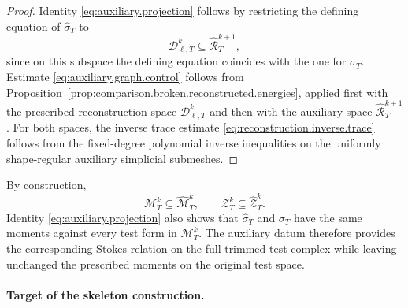 \documentclass[a4paper,11pt]{article}
\theoremstyle{definition}
\newcommand{\Dpoly}[2]{\mathcal D_{\ell,#1}^{#2}}
\begin{document}
\begin{proof}
Identity \eqref{eq:auxiliary.projection} follows by restricting the defining equation of $\widehat\sigma_T$ to
\[
  \Dpoly{T}{k}
  \subseteq
  \widehat{\mathcal R}_T^{k+1},
\]
since on this subspace the defining equation coincides with the one for $\sigma_T$.
Estimate \eqref{eq:auxiliary.graph.control} follows from Proposition~\ref{prop:comparison.broken.reconstructed.energies}, applied first with the prescribed reconstruction space $\Dpoly{T}{k}$ and then with the auxiliary space $\widehat{\mathcal R}_T^{k+1}$.
For both spaces, the inverse trace estimate \eqref{eq:reconstruction.inverse.trace} follows from the fixed-degree polynomial inverse inequalities on the uniformly shape-regular auxiliary simplicial submeshes.
\end{proof}

By construction,
\[
  \mathcal M_T^k
  \subseteq
  \widehat{\mathcal M}_T^k,
  \qquad
  \mathcal Z_T^k
  \subseteq
  \widehat{\mathcal Z}_T^k.
\]
Identity \eqref{eq:auxiliary.projection} also shows that $\widehat\sigma_T$ and $\sigma_T$ have the same moments against every test form in $\mathcal M_T^k$.
The auxiliary datum therefore provides the corresponding Stokes relation on the full trimmed test complex while leaving unchanged the prescribed moments on the original test space.

\paragraph*{Target of the skeleton construction.}
\end{document}
